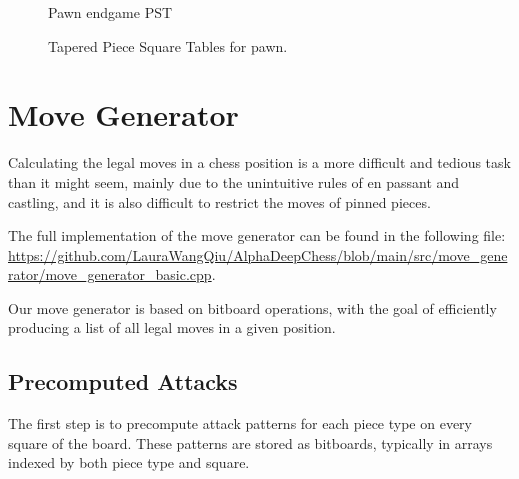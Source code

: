 \begin{figure}[H]
\begin{minipage}{0.4\textwidth}
        \caption*{Pawn endgame PST}
    \end{minipage}
    \caption{Tapered Piece Square Tables for pawn.}
    \label{fig:taperedPSTpawns}
\end{figure}

\newpage

\section{Move Generator}

\noindent Calculating the legal moves in a chess position is a more difficult and tedious task
than it might seem, mainly due to the unintuitive rules of en passant and castling,
and it is also difficult to restrict the moves of pinned pieces. ~\cite{GenerateLegalMovesEfficiently}

\vspace{1em}

The full implementation of the move generator can be found in the following file:\\
\scriptsize\url{https://github.com/LauraWangQiu/AlphaDeepChess/blob/main/src/move_generator/move_generator_basic.cpp}\normalsize.

\vspace{2em}

\noindent Our move generator is based on bitboard operations, with the goal of efficiently producing a list of all legal moves in a given position.

\subsection*{Precomputed Attacks}

\noindent The first step is to precompute attack patterns for each piece type on every square of the board. These patterns are stored as bitboards, typically in arrays indexed by both piece type and square.

